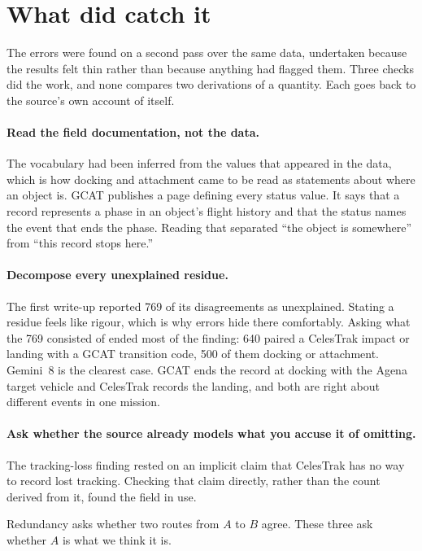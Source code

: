 \section{What did catch it}
\label{sec:caught}

The errors were found on a second pass over the same data, undertaken because
the results felt thin rather than because anything had flagged them. Three
checks did the work, and none compares two derivations of a quantity. Each goes
back to the source's own account of itself.

\paragraph{Read the field documentation, not the data.}
The vocabulary had been inferred from the values that appeared in the data,
which is how docking and attachment came to be read as statements about where an
object is. GCAT publishes a page defining every status value. It says that a
record represents a phase in an object's flight history and that the status
names the event that ends the phase. Reading that separated ``the object is
somewhere'' from ``this record stops here.''

\paragraph{Decompose every unexplained residue.}
The first write-up reported 769 of its disagreements as unexplained. Stating a
residue feels like rigour, which is why errors hide there comfortably. Asking what
the 769 consisted of ended most of the finding: 640 paired a CelesTrak impact or
landing with a GCAT transition code, 500 of them docking or attachment. Gemini~8
is the clearest case. GCAT ends the record at docking with the Agena target
vehicle and CelesTrak records the landing, and both are right about different
events in one mission.

\paragraph{Ask whether the source already models what you accuse it of omitting.}
The tracking-loss finding rested on an implicit claim that CelesTrak has no way
to record lost tracking. Checking that claim directly, rather than the count
derived from it, found the field in use.

Redundancy asks whether two routes from $A$ to $B$ agree. These three ask
whether $A$ is what we think it is.

